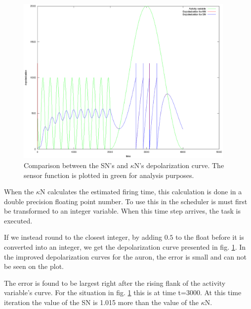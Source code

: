 \begin{figure}[hb!tp]
	\centering
		\includegraphics[width=0.95\textwidth]{eps_Comparison_between_the_two_sensors__depol_FIKSA.eps}
	\caption{Comparison between the SN's and $\kappa$N's depolarization curve. The sensor function is plotted in green for analysis purposes.}
	\label{figComparisonBetweenSsensorAndKsensorDepolCurveFIXEdError}
\end{figure}

When the $\kappa$N calculates the estimated firing time, this calculation is done in a double precision floating point number. 
To use this in the scheduler is must first be transformed to an integer variable. When this time step arrives, the task is executed.

If we instead round to the closest integer, by adding $0.5$ to the float before it is converted into an integer, we get the depolarization curve presented in fig. \ref{figComparisonBetweenSsensorAndKsensorDepolCurveFIXEdError}.
In the improved depolarization curves for the auron, the error is small and can not be seen on the plot.

The error is found to be largest right after the rising flank of the activity variable's curve. %
For the situation in fig. \ref{figComparisonBetweenSsensorAndKsensorDepolCurveFIXEdError} this is at time t=3000.
At this time iteration the value of the SN is 1.015 more than the value of the $\kappa$N. 

